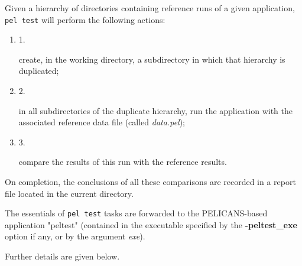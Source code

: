 \documentclass{article}
\begin{document}
Given a hierarchy of directories containing reference runs
of a given application, \texttt{pel test} will perform the following actions:

\begin{enumerate}

\item 1.

create, in the
working directory, a subdirectory
in which that hierarchy is duplicated;


\item 2.

in all subdirectories of the duplicate hierarchy, run the application
with the associated reference data file (called \emph{data.pel});


\item 3.

compare the results of this run with the reference results.

\end{enumerate}


On completion, the conclusions of all these comparisons are recorded
in a report file located in the current directory.



The essentials of \texttt{pel test} tasks are forwarded to the PELICANS-based
application "peltest" (contained in the executable specified by the
\textbf{-peltest\_exe} option if any, or by the argument \emph{exe}).



Further details are given below.
\end{document}
